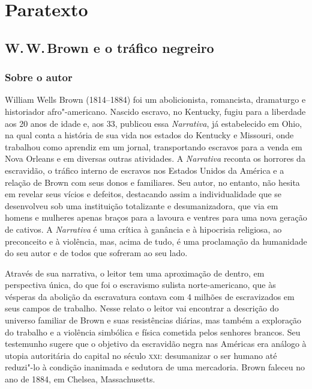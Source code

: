 \part{Paratexto}

\chapter{\textsc{W.\,W.}\,Brown e o tráfico negreiro}

\section{Sobre o autor}

William Wells Brown (1814--1884) foi um abolicionista, romancista, dramaturgo e historiador afro"-americano. Nascido escravo, no Kentucky, fugiu para a liberdade aos 20 anos de idade e, aos 33, publicou essa \textit{Narrativa}, já estabelecido em Ohio, na qual conta a história de sua vida nos estados do Kentucky e Missouri, onde trabalhou como aprendiz em um jornal, transportando escravos para a venda em Nova Orleans e em diversas outras atividades. A \textit{Narrativa} reconta os horrores da escravidão, o tráfico interno de escravos nos Estados Unidos da América e a relação de Brown com seus donos e familiares. Seu autor, no entanto, não hesita em revelar seus vícios e defeitos, destacando assim a individualidade que se desenvolveu sob uma instituição totalizante e desumanizadora, que via em homens e mulheres apenas braços para a lavoura e ventres para uma nova geração de cativos. A \textit{Narrativa} é uma crítica à ganância e à hipocrisia religiosa, ao preconceito e à violência, mas, acima de tudo, é uma proclamação da humanidade do seu autor e de todos que sofreram ao seu lado.

Através de sua narrativa, o leitor tem uma aproximação de dentro, em perspectiva única, do que foi o escravismo sulista norte-americano, que às vésperas da abolição da escravatura contava com 4 milhões de escravizados em seus campos de trabalho. Nesse relato o leitor vai encontrar a descrição do universo familiar de Brown e suas resistências diárias, mas também a exploração do trabalho e a violência simbólica e física cometida pelos senhores brancos. Seu testemunho sugere que o objetivo da escravidão negra nas Américas era análogo à utopia autoritária do capital no século \textsc{xxi}: desumanizar o ser humano até reduzi"-lo à condição inanimada e sedutora de uma mercadoria.
Brown faleceu no ano de 1884, em Chelsea, Massachusetts.

